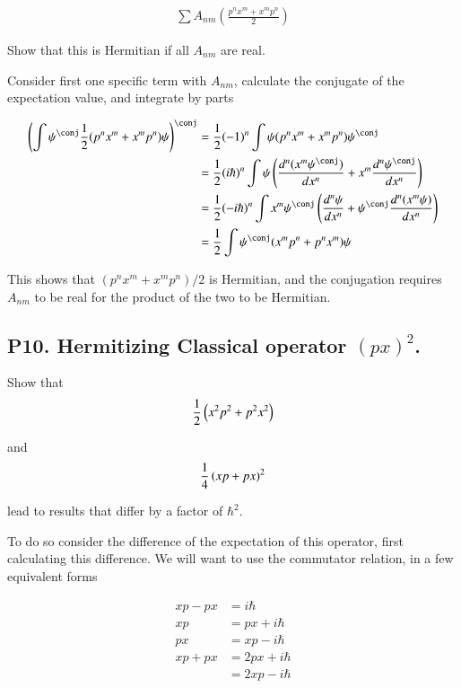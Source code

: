 \begin{align*}
\sum A_{nm} \left(\frac{p^n x^m + x^m p^n}{2}\right) 
\end{align*}

Show that this is Hermitian if all $A_{nm}$ are real.

Consider first one specific term with $A_{nm}$, calculate the conjugate of the expectation value, and integrate
by parts

\begin{align*}
\left(
\int \psi^\conj \inv{2}(p^n x^m + x^m p^n) \psi
\right)^\conj
&=
\inv{2} (-1)^n
\int \psi (p^n x^m + x^m p^n) \psi^\conj \\
&=
\inv{2} (i\hbar)^n 
\int \psi \left(\frac{d^n (x^m \psi^\conj)}{dx^n} + x^m \frac{d^n \psi^\conj}{dx^n} \right) \\
&=
\inv{2} (-i\hbar)^n 
\int x^m \psi^\conj \left(\frac{d^n \psi }{dx^n} + \psi^\conj \frac{d^n (x^m \psi)}{dx^n} \right) \\
&=
\inv{2}
\int \psi^\conj ( x^m p^n + p^n x^m ) \psi
\end{align*}

This shows that $(p^n x^m + x^m p^n)/2$ is Hermitian, and the conjugation requires $A_{nm}$ to be real for the
product of the two to be Hermitian.

\subsection{P10. Hermitizing Classical operator $(px)^2$. }

Show that 
\begin{align*}
\frac{1}{2}\left(x^2 p^2 + p^2 x^2 \right)
\end{align*}

and 
\begin{align*}
\frac{1}{4}\left(x p + p x \right)^2
\end{align*}

lead to results that differ by a factor of $\hbar^2$.

To do so consider the difference of the expectation of this operator, first calculating this difference.  We will
want to use the commutator relation, in a few equivalent forms

\begin{align*}
xp - p x &= i \hbar \\
xp &= p x + i \hbar \\
px &= x p - i \hbar \\
x p + p x &= 2 p x + i \hbar \\
          &= 2 x p - i \hbar \\
\end{align*}

